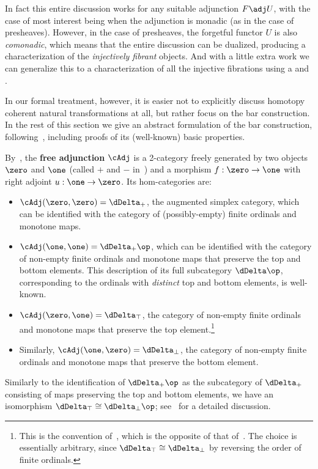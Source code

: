 In fact this entire discussion works for any suitable adjunction $F\adj U$, with the case of most interest being when the adjunction is monadic (as in the case of presheaves).
However, in the case of presheaves, the forgetful functor $U$ is also \emph{comonadic}, which means that the entire discussion can be dualized, producing a characterization of the \emph{injectively fibrant} objects.
And with a little extra work we can generalize this to a characterization of all the injective fibrations using a \local and \stratified \nfs.

In our formal treatment, however, it is easier not to explicitly discuss homotopy coherent natural transformations at all, but rather focus on the bar construction.
In the rest of this section we give an abstract formulation of the bar construction, following~\cite{rv:hcadj-ftm,rv:elements}, including proofs of its (well-known) basic properties.

By~\cite{ss:free-adj,rv:hcadj-ftm}, the \textbf{free adjunction} $\cAdj$ is a 2-category freely generated by two objects $\zero$ and $\one$ (called $+$ and $-$ in~\cite{rv:hcadj-ftm}) and a morphism $f:\zero\to \one$ with right adjoint $u:\one\to \zero$.
Its hom-categories are:
\begin{itemize}
\item $\cAdj(\zero,\zero) = \dDelta_+$, the augmented simplex category, which can be identified with the category of (possibly-empty) finite ordinals and monotone maps.
\item $\cAdj(\one,\one) = \dDelta_+\op$, which can be identified with the category of non-empty finite ordinals and monotone maps that preserve the top and bottom elements.
  This description of its full subcategory $\dDelta\op$, corresponding to the ordinals with \emph{distinct} top and bottom elements, is well-known.
\item $\cAdj(\zero,\one) = \dDelta_\top$, the category of non-empty finite ordinals and monotone maps that preserve the top element.\footnote{This is the convention of~\cite{ss:free-adj}, which is the opposite of that of~\cite{rv:hcadj-ftm}.
  The choice is essentially arbitrary, since $\dDelta_\top\cong\dDelta_\bot$ by reversing the order of finite ordinals.}
\item Similarly, $\cAdj(\one,\zero) = \dDelta_\bot$, the category of non-empty finite ordinals and monotone maps that preserve the bottom element.
\end{itemize}
Similarly to the identification of $\dDelta_+\op$ as the subcategory of $\dDelta_+$ consisting of maps preserving the top and bottom elements, we have an isomorphism $\dDelta_\top \cong \dDelta_\bot\op$; see~\cite[Observation 3.3.6]{rv:hcadj-ftm} for a detailed discussion.

